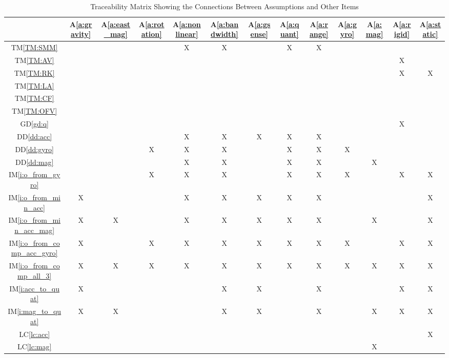 \documentclass[12pt]{article}
\newcounter{defnum} %
\newcommand{\dref}[1]{GD\ref{#1}} \newcounter{datadefnum} %
\newcommand{\ddref}[1]{DD\ref{#1}} \newcounter{theorynum} %
\newcommand{\tref}[1]{TM\ref{#1}} \newcounter{tablenum} %
\newcommand{\aref}[1]{A\ref{#1}} \newcounter{goalnum} %
\newcommand{\iref}[1]{IM\ref{#1}} \newcounter{reqnum} %
\newcommand{\lcref}[1]{LC\ref{#1}}
\begin{document}
\begin{table}[h!]
\centering
\begin{tabular}{|c|c|c|c|c|c|c|c|c|c|c|c|c|}
\hline
	& \aref{a:gravity}
	&\aref{a:east_mag}&\aref{a:rotation}&\aref{a:nonlinear}&\aref{a:bandwidth}&\aref{a:gsense}&\aref{a:quant}&\aref{a:range}&\aref{a:gyro}&\aref{a:mag}
	&\aref{a:rigid}& \aref{a:static} \\
\hline
\tref{TM:SMM}               & & & &X&X& &X&X& & & & \\ \hline
\tref{TM:AV}                & & & & & & & & & & &X& \\ \hline
\tref{TM:RK}                & & & & & & & & & & &X&X\\ \hline
\tref{TM:LA}                & & & & & & & & & & & & \\ \hline
\tref{TM:CF}                & & & & & & & & & & & & \\ \hline
\tref{TM:OFV}               & & & & & & & & & & & & \\ \hline
\dref{gd:q}                 & & & & & & & & & & &X& \\ \hline
\ddref{dd:acc}              & & & &X&X&X&X&X& & & & \\ \hline
\ddref{dd:gyro}             & & &X&X&X& &X&X&X& & & \\ \hline
\ddref{dd:mag}              & & & &X&X& &X&X& &X& & \\ \hline
\iref{i:o_from_gyro}        & & &X&X&X& &X&X&X& &X&X\\ \hline
\iref{i:o_from_min_acc}     &X& & &X&X&X&X&X& & & &X\\ \hline
\iref{i:o_from_min_acc_mag} &X&X& &X&X&X&X&X& &X& &X\\ \hline
\iref{i:o_from_comp_acc_gyro}&X& &X&X&X&X&X&X&X& &X&X\\ \hline
\iref{i:o_from_comp_all_3}  &X&X&X&X&X&X&X&X&X&X&X&X \\ \hline
\iref{i:acc_to_quat}        &X& & & &X&X& &X& & &X&X\\ \hline
\iref{i:mag_to_quat}        &X&X& & &X&X& &X& &X&X&X\\ \hline
\lcref{lc:acc}              & & & & & & & & &  & & &X\\ \hline
\lcref{lc:mag}              & & & & & & & & & &X& & \\ \hline
\end{tabular}
\caption{Traceability Matrix Showing the Connections Between Assumptions and Other Items}
\label{Table:A_trace}
\end{table}
\end{document}
